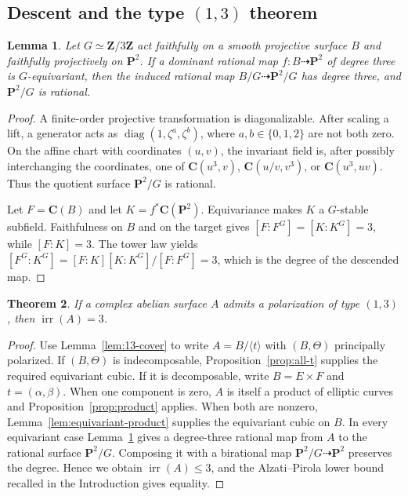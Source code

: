 \documentclass[12pt]{amsart}
\numberwithin{equation}{section}
\newtheorem{theorem}{Theorem}[section]
\newtheorem{lemma}[theorem]{Lemma}
\theoremstyle{definition}
\theoremstyle{remark}
\newcommand{\C}{\mathbf C}
\newcommand{\Z}{\mathbf Z}
\newcommand{\PP}{\mathbf P}
\newcommand{\irr}{\operatorname{irr}}
\begin{document}
\subsection{Descent and the type \texorpdfstring{$(1,3)$}{(1,3)} theorem}

\begin{lemma}\label{lem:cyclic-descent}
Let $G\simeq\Z/3\Z$ act faithfully on a smooth projective
surface $B$ and faithfully projectively on $\PP^2$.  If a dominant
rational map $f:B\dashrightarrow\PP^2$ of degree three is
$G$-equivariant, then the induced rational map
$B/G\dashrightarrow\PP^2/G$ has degree three, and $\PP^2/G$ is rational.
\end{lemma}

\begin{proof}
A finite-order projective transformation is diagonalizable.  After
scaling a lift, a generator acts as
$\operatorname{diag}(1,\zeta^a,\zeta^b)$, where
$a,b\in\{0,1,2\}$ are not both zero.  On the affine chart with coordinates
$(u,v)$, the invariant field is, after possibly interchanging the
coordinates, one of
$\C(u^3,v)$, $\C(u/v,v^3)$, or $\C(u^3,uv)$.  Thus the quotient surface
$\PP^2/G$ is rational.

Let $F=\C(B)$ and let $K=f^*\C(\PP^2)$.  Equivariance makes $K$ a
$G$-stable subfield.  Faithfulness on $B$ and on the target gives
$[F:F^G]=[K:K^G]=3$, while $[F:K]=3$.  The tower law yields
$[F^G:K^G]=[F:K][K:K^G]/[F:F^G]=3$, which is the degree of the descended
map.
\end{proof}

\begin{theorem}\label{thm:type13}
If a complex abelian surface $A$ admits a polarization of type $(1,3)$,
then $\irr(A)=3$.
\end{theorem}

\begin{proof}
Use Lemma~\ref{lem:13-cover} to write $A=B/\langle t\rangle$ with
$(B,\Theta)$ principally polarized.  If $(B,\Theta)$ is indecomposable,
Proposition~\ref{prop:all-t} supplies the required equivariant cubic.  If
it is decomposable, write $B=E\times F$ and $t=(\alpha,\beta)$.  When one
component is zero, $A$ is itself a product of elliptic curves and
Proposition~\ref{prop:product} applies.  When both are nonzero,
Lemma~\ref{lem:equivariant-product} supplies the equivariant cubic on
$B$.  In every equivariant case Lemma~\ref{lem:cyclic-descent} gives a
degree-three rational map from $A$ to the rational surface $\PP^2/G$.
Composing it with a birational map $\PP^2/G\dashrightarrow\PP^2$
preserves the degree.  Hence we obtain $\irr(A)\leq3$, and the
Alzati--Pirola lower bound recalled in the
Introduction gives equality.
\end{proof}
\end{document}
